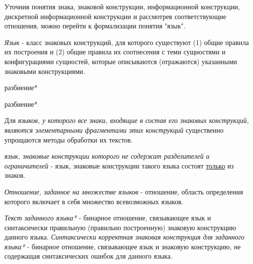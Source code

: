 Уточнив понятия знака, знаковой конструкции, информационной конструкции, дискретной информационной конструкции и рассмотрев соответствующие отношения, можно перейти к формализации понятия "язык"{}.

\textit{Язык} - класс знаковых конструкций, для которого существуют (1) общие правила их построения и (2) общие правила их соотнесения с теми сущностями и конфигурациями сущностей, которые описываются (отражаются) указанными знаковыми конструкциями.

\begin{SCn}

    \begin{scnrelfromset}{разбиение*}
        \begin{scnrelfromset}{разбиение*}
        \end{scnrelfromset}
    \end{scnrelfromset}

\end{SCn}

Для \textit{языков, у которого все знаки, входящие в состав его знаковых конструкций, являются элементарными фрагментами этих конструкций} существенно упрощаются методы обработки их текстов.

\textit{язык, знаковые конструкции которого не содержат разделителей и ограничителей} - язык, знаковые конструкции такого языка состоят \underline{только} из знаков.

\textit{Отношение, заданное на множестве языков\scnsupergroupsign} - отношение, область определения которого включает в себя множество всевозможных языков.

\textit{Текст заданного языка*} - бинарное отношение, связывающее язык и синтаксически правильную (правильно построенную) знаковую конструкцию данного языка.
\textit{Синтаксически корректная знаковая конструкция для заданного языка*} - бинарное отношение, связывающее язык и знаковую конструкцию, не содержащая синтаксических ошибок для данного языка.

